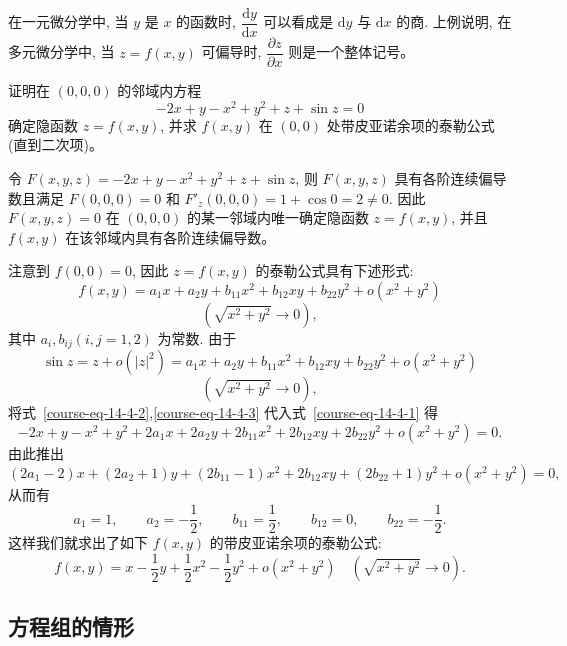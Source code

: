 \documentclass[12pt,fontset=fandol]{ctexart}
\begin{document}
\begin{remark}\quad 在一元微分学中, 当 $y$ 是 $x$ 的函数时, $\dfrac{\mathrm dy}{\mathrm dx}$ 可以看成是 $\mathrm dy$ 与 $\mathrm dx$ 的商. 上例说明, 在多元微分学中, 当 $z=f(x,y)$ 可偏导时, $\dfrac{\partial z}{\partial x}$ 则是一个整体记号。

\end{remark}
\begin{example}\label{course-example-14-4-2}\quad 证明在 $(0,0,0)$ 的邻域内方程
\begin{equation}
  -2x+y-x^2+y^2+z+\sin z=0
  \label{course-eq-14-4-1}
\end{equation}
确定隐函数 $z=f(x,y)$, 并求 $f(x,y)$ 在 $(0,0)$ 处带皮亚诺余项的泰勒公式 (直到二次项)。

\end{example}
\begin{solve}\quad 令 $F(x,y,z)=-2x+y-x^2+y^2+z+\sin z$, 则 $F(x,y,z)$ 具有各阶连续偏导数且满足 $F(0,0,0)=0$ 和 $F'_z(0,0,0)=1+\cos0=2\ne0$. 因此 $F(x,y,z)=0$ 在 $(0,0,0)$ 的某一邻域内唯一确定隐函数 $z=f(x,y)$, 并且 $f(x,y)$ 在该邻域内具有各阶连续偏导数。

注意到 $f(0,0)=0$, 因此 $z=f(x,y)$ 的泰勒公式具有下述形式:
\begin{equation}
  f(x,y)=a_1x+a_2y+b_{11}x^2+b_{12}xy+b_{22}y^2+o(x^2+y^2)
  \label{course-eq-14-4-2}
\end{equation}
\[
  (\sqrt{x^2+y^2}\to0),
\]
其中 $a_i,b_{ij}(i,j=1,2)$ 为常数. 由于
\begin{equation}\label{course-eq-14-4-3}
  \sin z=z+o(|z|^2)
  =a_1x+a_2y+b_{11}x^2+b_{12}xy+b_{22}y^2+o(x^2+y^2)
\end{equation}
\[
  (\sqrt{x^2+y^2}\to0),
\]
将式~\eqref{course-eq-14-4-2},\eqref{course-eq-14-4-3}  代入式~\eqref{course-eq-14-4-1}  得
\[
  -2x+y-x^2+y^2+2a_1x+2a_2y+2b_{11}x^2+2b_{12}xy+2b_{22}y^2+o(x^2+y^2)=0.
\]
由此推出
\[
  (2a_1-2)x+(2a_2+1)y+(2b_{11}-1)x^2
  +2b_{12}xy+(2b_{22}+1)y^2+o(x^2+y^2)=0,
\]
从而有
\[
  a_1=1,\qquad a_2=-\frac12,\qquad b_{11}=\frac12,\qquad
  b_{12}=0,\qquad b_{22}=-\frac12.
\]
这样我们就求出了如下 $f(x,y)$ 的带皮亚诺余项的泰勒公式:
\[
  f(x,y)=x-\frac12y+\frac12x^2-\frac12y^2+o(x^2+y^2)
  \quad(\sqrt{x^2+y^2}\to0).
\]

\end{solve}
\subsection{方程组的情形}
\end{document}
